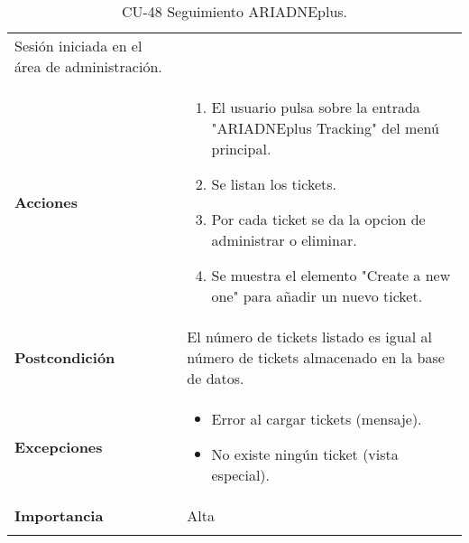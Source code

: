 \begin{longtable}[]{@{}ll@{}}
\begin{minipage}[t]{0.74\columnwidth}
Sesión iniciada en el área de administración.\strut
\end{minipage}\tabularnewline
\begin{minipage}[t]{0.20\columnwidth}\raggedright
\textbf{Acciones}\strut
\end{minipage} & \begin{minipage}[t]{0.74\columnwidth}\raggedright
\begin{enumerate}
\def\labelenumi{\arabic{enumi}.}
\tightlist
\item
  El usuario pulsa sobre la entrada "ARIADNEplus Tracking" del menú
  principal.
\item
  Se listan los tickets.
\item
  Por cada ticket se da la opcion de administrar o eliminar.
\item
  Se muestra el elemento "Create a new one" para añadir un nuevo ticket.
\end{enumerate}\strut
\end{minipage}\tabularnewline
\begin{minipage}[t]{0.20\columnwidth}\raggedright
\textbf{Postcondición}\strut
\end{minipage} & \begin{minipage}[t]{0.74\columnwidth}\raggedright
El número de tickets listado es igual al número de tickets almacenado en
la base de datos.\strut
\end{minipage}\tabularnewline
\begin{minipage}[t]{0.20\columnwidth}\raggedright
\textbf{Excepciones}\strut
\end{minipage} & \begin{minipage}[t]{0.74\columnwidth}\raggedright
\begin{itemize}
\tightlist
\item
  Error al cargar tickets (mensaje).
\item
  No existe ningún ticket (vista especial).
\end{itemize}\strut
\end{minipage}\tabularnewline
\begin{minipage}[t]{0.20\columnwidth}\raggedright
\textbf{Importancia}\strut
\end{minipage} & \begin{minipage}[t]{0.74\columnwidth}\raggedright
Alta\strut
\end{minipage}\tabularnewline
\bottomrule
\caption{CU-48 Seguimiento ARIADNEplus.}
\end{longtable}

